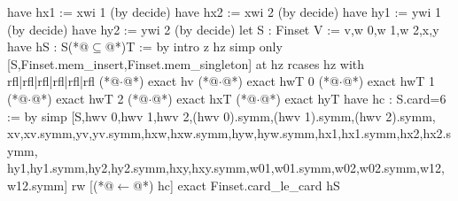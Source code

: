   have hx1 := xwi 1 (by decide)
  have hx2 := xwi 2 (by decide)
  have hy1 := ywi 1 (by decide)
  have hy2 := ywi 2 (by decide)
  let S : Finset V := {v,w 0,w 1,w 2,x,y}
  have hS : S(*@$\subseteq$@*)T := by
    intro z hz
    simp only [S,Finset.mem_insert,Finset.mem_singleton] at hz
    rcases hz with rfl|rfl|rfl|rfl|rfl|rfl
    (*@$\cdot$@*) exact hv
    (*@$\cdot$@*) exact hwT 0
    (*@$\cdot$@*) exact hwT 1
    (*@$\cdot$@*) exact hwT 2
    (*@$\cdot$@*) exact hxT
    (*@$\cdot$@*) exact hyT
  have hc : S.card=6 := by
    simp [S,hwv 0,hwv 1,hwv 2,(hwv 0).symm,(hwv 1).symm,(hwv 2).symm,
      xv,xv.symm,yv,yv.symm,hxw,hxw.symm,hyw,hyw.symm,hx1,hx1.symm,hx2,hx2.symm,
      hy1,hy1.symm,hy2,hy2.symm,hxy,hxy.symm,w01,w01.symm,w02,w02.symm,w12,w12.symm]
  rw [(*@$\leftarrow$@*) hc]
  exact Finset.card_le_card hS

